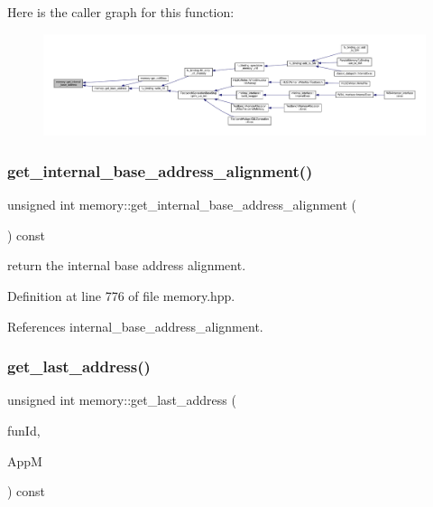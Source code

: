 Here is the caller graph for this function\+:
\nopagebreak
\begin{figure}[H]
\begin{center}
\leavevmode
\includegraphics[width=350pt]{d8/d99/classmemory_a9a124e4167f009e2f3c1b4343c42c2d0_icgraph}
\end{center}
\end{figure}
\mbox{\label{classmemory_a0e9c0cfa49050ae635406d185b94809a}} 
\subsubsection{\texorpdfstring{get\+\_\+internal\+\_\+base\+\_\+address\+\_\+alignment()}{get\_internal\_base\_address\_alignment()}}
{\footnotesize\ttfamily unsigned int memory\+::get\+\_\+internal\+\_\+base\+\_\+address\+\_\+alignment (\begin{DoxyParamCaption}{ }\end{DoxyParamCaption}) const\hspace{0.3cm}{\ttfamily [inline]}}



return the internal base address alignment. 



Definition at line 776 of file memory.\+hpp.



References internal\+\_\+base\+\_\+address\+\_\+alignment.

\mbox{\label{classmemory_a7fa2c69835e5b2deefc2b380f710b470}} 
\subsubsection{\texorpdfstring{get\+\_\+last\+\_\+address()}{get\_last\_address()}}
{\footnotesize\ttfamily unsigned int memory\+::get\+\_\+last\+\_\+address (\begin{DoxyParamCaption}\item[{unsigned int}]{fun\+Id,  }\item[{const \hyperlink{application__manager_8hpp_a04ccad4e5ee401e8934306672082c180}{application\+\_\+manager\+Ref}}]{AppM }\end{DoxyParamCaption}) const}



